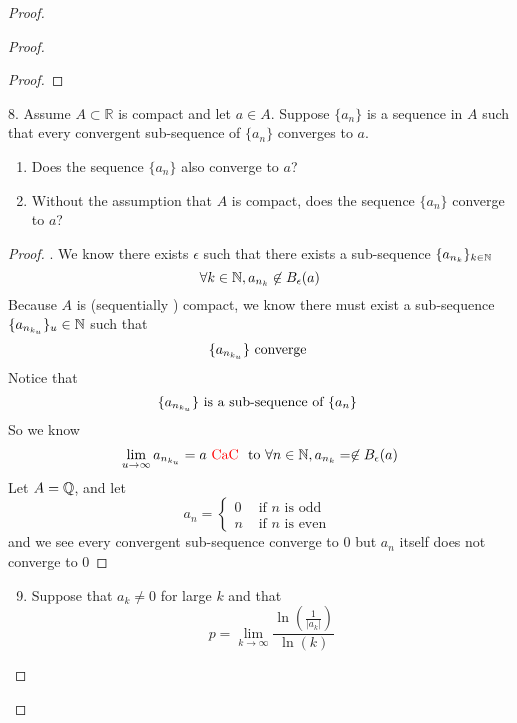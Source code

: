 \documentclass{report}
\begin{document}
\begin{proof}
\begin{proof}
\begin{proof}
\end{proof}
\begin{question}{}{}
8. Assume \( A \subset \mathbb{R} \) is compact and let \( a \in A \). Suppose \( \{ a_n \} \) is a sequence in \( A \) such that every convergent sub-sequence of \( \{ a_n \} \) converges to \( a \). 
    \begin{enumerate}
        \item Does the sequence \( \{ a_n \} \) also converge to \( a \)?
        \item Without the assumption that \( A \) is compact, does the sequence \( \{ a_n \} \) converge to \( a \)?
    \end{enumerate}
\end{question}
\begin{proof}
. We know there exists $\epsilon $ such that there exists a sub-sequence $\{ a_{n_k} \}_{k\in\mathbb{N}}$
\begin{equation}
\forall k\in\mathbb{N}, a_{n_k}\not\in B_{\epsilon }(a)
\end{equation}
Because  $A$ is (sequentially ) compact,  we know there must exist a sub-sequence $\{ a_{n_{k_u}} \}_u\in\mathbb{N}$ such that
\begin{equation}
\{ a_{n_{k_u}} \}\text{ converge }
\end{equation}
Notice that
\begin{equation}
\{ a_{n_{k_u}} \}\text{ is a sub-sequence of $\{ a_n \}$ }
\end{equation}
So we know 
 \begin{equation}
\lim_{u\to\infty}a_{n_{k_u}}=a\text{ \textcolor{red}{CaC} }\text{ to }\forall n\in\mathbb{N}, a_{n_{k}}=\not\in B_\epsilon (a)
\end{equation}
Let $A=\mathbb{Q}$, and let
 \begin{equation}
a_n=\begin{cases}
  0& \text{ if $n$ is odd }\\
  n& \text{ if $n$ is even }
\end{cases}
\end{equation}
and we see every convergent sub-sequence converge to $0$ but  $a_n$ itself does not converge to  $0$
\end{proof}
\begin{question}{}{}
\begin{enumerate}
    \setcounter{enumi}{8}
    \item Suppose that \( a_k \neq 0 \) for large \( k \) and that
    \[
    p = \lim_{{k \to \infty}} \frac{\ln\left(\frac{1}{|a_k|}\right)}{\ln(k)}
\]
\end{enumerate}
\end{question}
\end{proof}
\end{proof}
\end{document}
